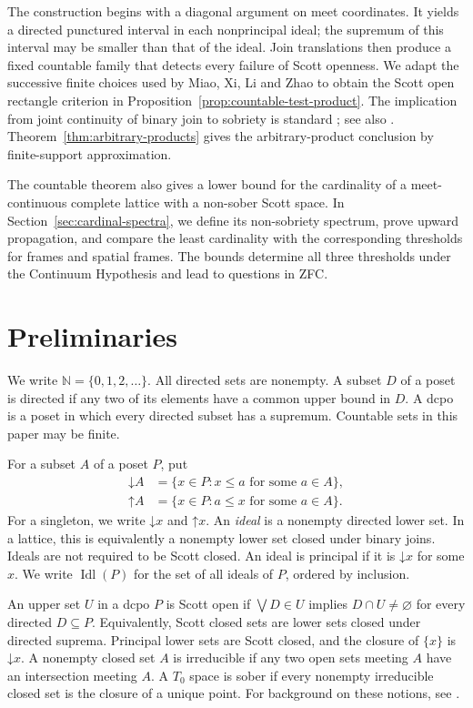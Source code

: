 \documentclass[preprint,11pt]{elsarticle}
\theoremstyle{definition}
\theoremstyle{remark}
\numberwithin{equation}{section}
\newcommand{\N}{\mathbb N}
\newcommand{\down}[1]{\mathord{\downarrow}#1}
\newcommand{\up}[1]{\mathord{\uparrow}#1}
\newcommand{\Idl}{\operatorname{Idl}}
\begin{document}
The construction begins with a diagonal argument on meet coordinates. It yields a directed punctured interval in each nonprincipal ideal; the supremum of this interval may be smaller than that of the ideal. Join translations then produce a fixed countable family that detects every failure of Scott openness. We adapt the successive finite choices used by Miao, Xi, Li and Zhao \cite[Lemma~4.1]{Miao} to obtain the Scott open rectangle criterion in Proposition~\ref{prop:countable-test-product}. The implication from joint continuity of binary join to sobriety is standard \cite[Proposition~5.1 and Corollary~5.2]{LawsonXu}; see also \cite[Section~6]{Hertling}. Theorem~\ref{thm:arbitrary-products} gives the arbitrary-product conclusion by finite-support approximation.

The countable theorem also gives a lower bound for the cardinality of a meet-continuous complete lattice with a non-sober Scott space. In Section~\ref{sec:cardinal-spectra}, we define its non-sobriety spectrum, prove upward propagation, and compare the least cardinality with the corresponding thresholds for frames and spatial frames. The bounds determine all three thresholds under the Continuum Hypothesis and lead to questions in ZFC.

\section{Preliminaries}
We write $\N=\{0,1,2,\ldots\}$. All directed sets are nonempty. A subset $D$ of a poset is directed if any two of its elements have a common upper bound in $D$. A dcpo is a poset in which every directed subset has a supremum. Countable sets in this paper may be finite.

For a subset $A$ of a poset $P$, put
\[
\begin{aligned}
 \down A&=\{x\in P:x\le a\text{ for some }a\in A\},\\
 \up A&=\{x\in P:a\le x\text{ for some }a\in A\}.
\end{aligned}
\]
For a singleton, we write $\down x$ and $\up x$. An \emph{ideal} is a nonempty directed lower set. In a lattice, this is equivalently a nonempty lower set closed under binary joins. Ideals are not required to be Scott closed. An ideal is principal if it is $\down x$ for some $x$. We write $\Idl(P)$ for the set of all ideals of $P$, ordered by inclusion.

An upper set $U$ in a dcpo $P$ is Scott open if $\bigvee D\in U$ implies $D\cap U\ne\varnothing$ for every directed $D\subseteq P$. Equivalently, Scott closed sets are lower sets closed under directed suprema. Principal lower sets are Scott closed, and the closure of $\{x\}$ is $\down x$. A nonempty closed set $A$ is irreducible if any two open sets meeting $A$ have an intersection meeting $A$. A $T_0$ space is sober if every nonempty irreducible closed set is the closure of a unique point. For background on these notions, see \cite{Gierz}.
\end{document}
